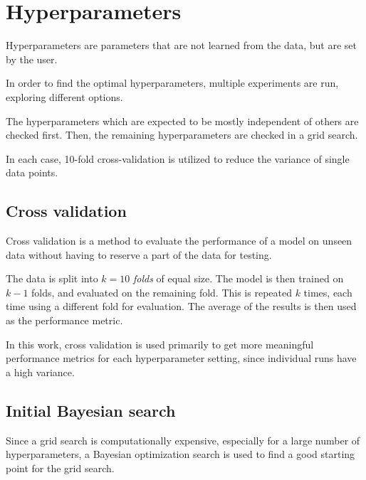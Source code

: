 \section{Hyperparameters}
Hyperparameters are parameters that are not learned from the data,
but are set by the user.

In order to find the optimal hyperparameters,
multiple experiments are run,
exploring different options.

The hyperparameters which are expected to be mostly independent of others are checked first.
Then, the remaining hyperparameters are checked in a grid search. %

In each case, 10-fold cross-validation is utilized to reduce the variance of single data points.


\subsection{Cross validation}
Cross validation is a method to evaluate the performance of a model on unseen data
without having to reserve a part of the data for testing.

The data is split into $k = 10$ \emph{folds} of equal size.
The model is then trained on $k-1$ folds,
and evaluated on the remaining fold.
This is repeated $k$ times,
each time using a different fold for evaluation.
The average of the results is then used as the performance metric.

In this work,
cross validation is used primarily to get more meaningful performance metrics
for each hyperparameter setting,
since individual runs have a high variance.

\subsection{Initial Bayesian search}
Since a grid search is computationally expensive,
  especially for a large number of hyperparameters,
a Bayesian optimization search is used to find a good starting point for the grid search.

